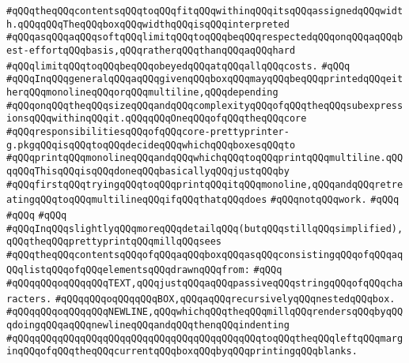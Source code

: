 \verb|#qQQqtheqQQqcontentsqQQqtoqQQqfitqQQqwithinqQQqitsqQQqassignedqQQqwidth.qQQqqQQqTheqQQqboxqQQqwidthqQQqisqQQqinterpreted|\newline
\verb|#qQQqasqQQqaqQQqsoftqQQqlimitqQQqtoqQQqbeqQQqrespectedqQQqonqQQqaqQQqbest-effortqQQqbasis,qQQqratherqQQqthanqQQqaqQQqhard|\newline
\verb|#qQQqlimitqQQqtoqQQqbeqQQqobeyedqQQqatqQQqallqQQqcosts.|\newline
\verb|#qQQq|\newline
\verb|#qQQqInqQQqgeneralqQQqaqQQqgivenqQQqboxqQQqmayqQQqbeqQQqprintedqQQqeitherqQQqmonolineqQQqorqQQqmultiline,qQQqdepending|\newline
\verb|#qQQqonqQQqtheqQQqsizeqQQqandqQQqcomplexityqQQqofqQQqtheqQQqsubexpressionsqQQqwithinqQQqit.qQQqqQQqOneqQQqofqQQqtheqQQqcore|\newline
\verb|#qQQqresponsibilitiesqQQqofqQQqcore-prettyprinter-g.pkgqQQqisqQQqtoqQQqdecideqQQqwhichqQQqboxesqQQqto|\newline
\verb|#qQQqprintqQQqmonolineqQQqandqQQqwhichqQQqtoqQQqprintqQQqmultiline.qQQqqQQqThisqQQqisqQQqdoneqQQqbasicallyqQQqjustqQQqby|\newline
\verb|#qQQqfirstqQQqtryingqQQqtoqQQqprintqQQqitqQQqmonoline,qQQqandqQQqretreatingqQQqtoqQQqmultilineqQQqifqQQqthatqQQqdoes|\newline
\verb|#qQQqnotqQQqwork.|\newline
\verb|#qQQq|\newline
\verb|#qQQq|\newline
\verb|#qQQq|\newline
\verb|#qQQqInqQQqslightlyqQQqmoreqQQqdetailqQQq(butqQQqstillqQQqsimplified),qQQqtheqQQqprettyprintqQQqmillqQQqsees|\newline
\verb|#qQQqtheqQQqcontentsqQQqofqQQqaqQQqboxqQQqasqQQqconsistingqQQqofqQQqaqQQqlistqQQqofqQQqelementsqQQqdrawnqQQqfrom:|\newline
\verb|#qQQq|\newline
\verb|#qQQqqQQqoqQQqqQQqTEXT,qQQqjustqQQqaqQQqpassiveqQQqstringqQQqofqQQqcharacters.|\newline
\verb|#qQQqqQQqoqQQqqQQqBOX,qQQqaqQQqrecursivelyqQQqnestedqQQqbox.|\newline
\verb|#qQQqqQQqoqQQqqQQqNEWLINE,qQQqwhichqQQqtheqQQqmillqQQqrendersqQQqbyqQQqdoingqQQqaqQQqnewlineqQQqandqQQqthenqQQqindenting|\newline
\verb|#qQQqqQQqqQQqqQQqqQQqqQQqqQQqqQQqqQQqqQQqqQQqtoqQQqtheqQQqleftqQQqmarginqQQqofqQQqtheqQQqcurrentqQQqboxqQQqbyqQQqprintingqQQqblanks.|\newline
